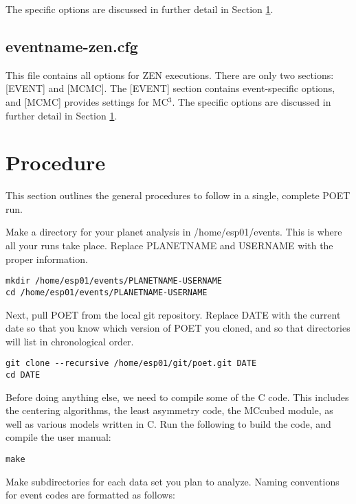 \documentclass[letterpaper,12pt]{article}
\begin{document}
The specific options are discussed in further detail in Section
\ref{sec:procedure}.

\subsection{eventname-zen.cfg}

This file contains all options for ZEN executions. There are only two
sections: [EVENT] and [MCMC]. The [EVENT] section contains
event-specific options, and [MCMC] provides settings for MC$^3$. The
specific options are discussed in further detail in Section
\ref{sec:procedure}.

\section{Procedure}
\label{sec:procedure}
This section outlines the general procedures to follow in a single,
complete POET run.

Make a directory for your planet analysis in /home/esp01/events. This is
where all your runs take place. Replace PLANETNAME and USERNAME with the
proper information.

\begin{verbatim}
mkdir /home/esp01/events/PLANETNAME-USERNAME
cd /home/esp01/events/PLANETNAME-USERNAME
\end{verbatim}

Next, pull POET from the local git repository. Replace DATE with the
current date so that you know which version of POET you cloned, and so
that directories will list in chronological order.

\begin{verbatim}
git clone --recursive /home/esp01/git/poet.git DATE
cd DATE
\end{verbatim}

Before doing anything else, we need to compile some of the C
code. This includes the centering algorithms, the least asymmetry
code, the MCcubed module, as well as various models written in C. Run
the following to build the code, and compile the user manual:

\begin{verbatim}
make
\end{verbatim}

Make subdirectories for each data set you plan to analyze. Naming conventions
for event codes are formatted as follows:
\end{document}
